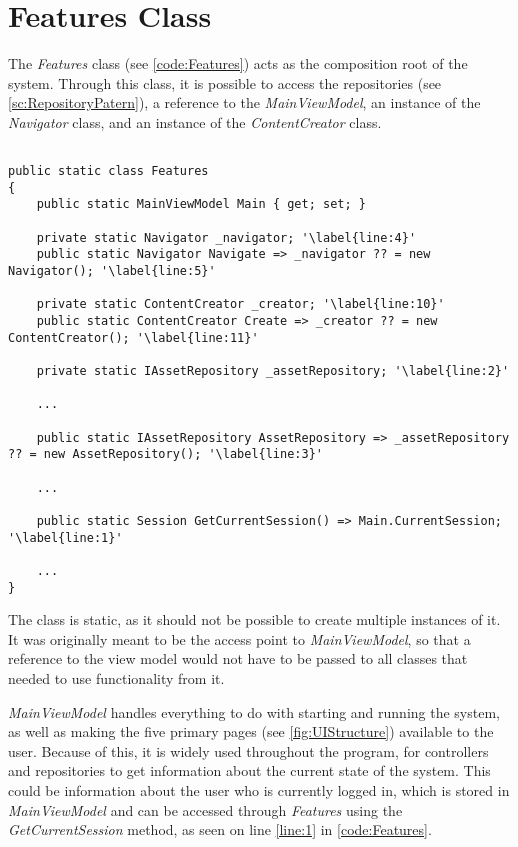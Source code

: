 \section{Features Class} \label{sc:features}
The \textit{Features} class (see \autoref{code:Features}) acts as the composition root of the system. Through this class, it is possible to access the repositories (see \autoref{sc:RepositoryPatern}), a reference to the \textit{MainViewModel}, an instance of the \textit{Navigator} class, and an instance of the \textit{ContentCreator} class.

\begin{listing}[H]
\begin{verbatim}

public static class Features 
{
    public static MainViewModel Main { get; set; }
    
    private static Navigator _navigator; '\label{line:4}'
    public static Navigator Navigate => _navigator ?? = new Navigator(); '\label{line:5}'

    private static ContentCreator _creator; '\label{line:10}'
    public static ContentCreator Create => _creator ?? = new ContentCreator(); '\label{line:11}'
    
    private static IAssetRepository _assetRepository; '\label{line:2}'
    
    ...
    
    public static IAssetRepository AssetRepository => _assetRepository ?? = new AssetRepository(); '\label{line:3}'
    
    ...
    
    public static Session GetCurrentSession() => Main.CurrentSession; '\label{line:1}'
    
    ... 
}

\end{verbatim}
\label{code:Features}
\end{listing}

The class is static, as it should not be possible to create multiple instances of it. It was originally meant to be the access point to \textit{MainViewModel}, so that a reference to the view model would not have to be passed to all classes that needed to use functionality from it.
\par
\textit{MainViewModel} handles everything to do with starting and running the system, as well as making the five primary pages (see \autoref{fig:UIStructure}) available to the user. Because of this, it is widely used throughout the program, for controllers and repositories to get information about the current state of the system. This could be information about the user who is currently logged in, which is stored in \textit{MainViewModel} and can be accessed through \textit{Features} using the \textit{GetCurrentSession} method, as seen on line \ref{line:1} in \autoref{code:Features}.
\par


